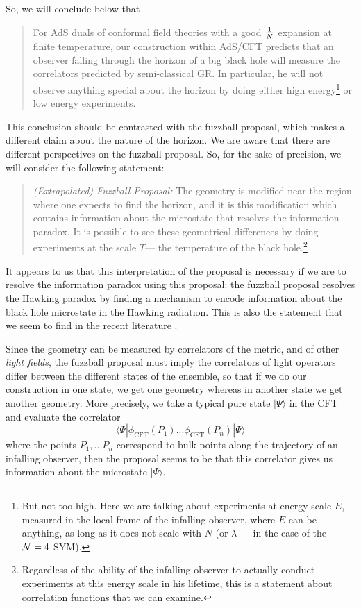 So, we will conclude below that
\begin{quote}
For AdS duals of conformal field theories with a good ${1 \over N}$ expansion at finite temperature, our construction within AdS/CFT predicts that an observer falling through the horizon of a big black hole will measure the correlators predicted by semi-classical GR. In particular, he will not observe anything special about the horizon by doing either high energy\footnote{But not too high. Here we are talking about experiments at energy scale $E$, measured in the local frame of the infalling observer, where $E$ can be anything, as long as it does not scale with $N$ (or $\lambda$ --- in the case of the ${\cal N}=4$ SYM).} or low energy experiments. 
\end{quote}

This conclusion should be contrasted with the fuzzball proposal, which makes a different claim about the nature of the horizon.  We are aware that there are different perspectives on the fuzzball proposal. So, for the sake of precision, we will consider the following statement:
\begin{quote}
{\it (Extrapolated) Fuzzball Proposal:} The geometry is modified near the region where one expects to find the horizon, and it is this modification which contains information about the microstate that resolves the information paradox. It is possible to see these geometrical differences by doing experiments at the scale $T$--- the temperature of the black hole.\footnote{Regardless of the ability of the infalling observer to actually conduct experiments at this energy scale in his lifetime, this is a statement about correlation functions that we can examine.}
\end{quote}
It appears to us that this interpretation of the proposal is necessary if we are to resolve the information paradox using this proposal: the fuzzball proposal resolves the Hawking paradox by finding a mechanism to encode information about the black hole microstate in the Hawking radiation. This is also the statement that we seem to find in the recent literature \cite{Mathur:2009hf,Mathur:2012np, Mathur:2011uj, Avery:2012tf,Chowdhury:2012vd}. 

Since the geometry can be measured by correlators of the metric, and of other {\em light fields}, the fuzzball proposal must imply the correlators of light operators differ between the different states of the ensemble, so that if we do our construction in one state, we get one geometry whereas in another state we get another geometry. More precisely, we take a typical pure state $|\Psi\rangle$ in the CFT and evaluate the correlator  
\begin{equation}
\label{finalcorrelator}
\langle \Psi| \phi_{\text{CFT}}(P_1)...\phi_{\text{CFT}}(P_n) |\Psi\rangle
\end{equation}
where the points $P_1,...P_n$ correspond to bulk points along the trajectory of an infalling observer, then the proposal seems to be that this correlator gives us information about the microstate $|\Psi \rangle$.

